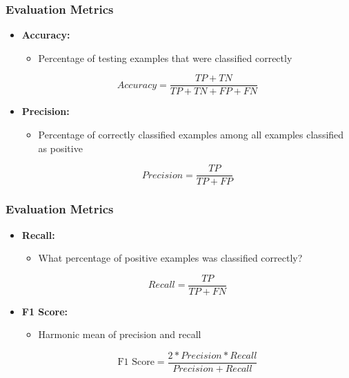 \begin{frame}
  \frametitle{Evaluation Metrics}
  \begin{itemize}
    \item \textbf{Accuracy:}
      \begin{itemize}
        \item Percentage of testing examples that were classified correctly
      \end{itemize}
      \begin{equation}
        Accuracy = \frac{TP + TN}{TP + TN + FP + FN}
      \end{equation}
    \item \textbf{Precision:}
      \begin{itemize}
        \item Percentage of correctly classified examples among all
          examples classified as positive
      \end{itemize}
      \begin{equation}
        Precision = \frac{TP}{TP + FP}
      \end{equation}
  \end{itemize}
\end{frame}

\begin{frame}
  \frametitle{Evaluation Metrics}
  \begin{itemize}
    \item \textbf{Recall:}
      \begin{itemize}
        \item What percentage of positive examples was classified
          correctly?
      \end{itemize}
      \begin{equation}
        Recall = \frac{TP}{TP + FN}
      \end{equation}
    \item \textbf{F1 Score:}
      \begin{itemize}
        \item Harmonic mean of precision and recall
      \end{itemize}
      \begin{equation}
        \text{F1 Score} = \frac{2*Precision*Recall}{Precision+Recall}
      \end{equation}
  \end{itemize}
\end{frame}
